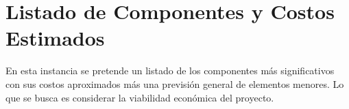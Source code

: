 \section{Listado de Componentes y Costos Estimados}
    En esta instancia se pretende un listado de los componentes más
    significativos con sus costos aproximados más una previsión general de
    elementos menores. Lo que se busca es considerar la viabilidad económica
    del proyecto.



